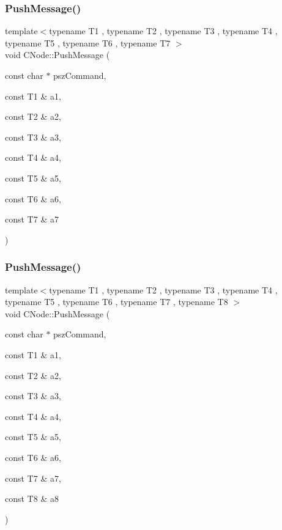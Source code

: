 \mbox{\label{class_c_node_ab3611cdb08d5f25a4da05fe140e48625}} 
\subsubsection{\texorpdfstring{Push\+Message()}{PushMessage()}\hspace{0.1cm}{\footnotesize\ttfamily [8/13]}}
{\footnotesize\ttfamily template$<$typename T1 , typename T2 , typename T3 , typename T4 , typename T5 , typename T6 , typename T7 $>$ \\
void C\+Node\+::\+Push\+Message (\begin{DoxyParamCaption}\item[{const char $\ast$}]{psz\+Command,  }\item[{const T1 \&}]{a1,  }\item[{const T2 \&}]{a2,  }\item[{const T3 \&}]{a3,  }\item[{const T4 \&}]{a4,  }\item[{const T5 \&}]{a5,  }\item[{const T6 \&}]{a6,  }\item[{const T7 \&}]{a7 }\end{DoxyParamCaption})\hspace{0.3cm}{\ttfamily [inline]}}

\mbox{\label{class_c_node_af91d09012aa7e879be4b488b0bba903d}} 
\subsubsection{\texorpdfstring{Push\+Message()}{PushMessage()}\hspace{0.1cm}{\footnotesize\ttfamily [9/13]}}
{\footnotesize\ttfamily template$<$typename T1 , typename T2 , typename T3 , typename T4 , typename T5 , typename T6 , typename T7 , typename T8 $>$ \\
void C\+Node\+::\+Push\+Message (\begin{DoxyParamCaption}\item[{const char $\ast$}]{psz\+Command,  }\item[{const T1 \&}]{a1,  }\item[{const T2 \&}]{a2,  }\item[{const T3 \&}]{a3,  }\item[{const T4 \&}]{a4,  }\item[{const T5 \&}]{a5,  }\item[{const T6 \&}]{a6,  }\item[{const T7 \&}]{a7,  }\item[{const T8 \&}]{a8 }\end{DoxyParamCaption})\hspace{0.3cm}{\ttfamily [inline]}}

